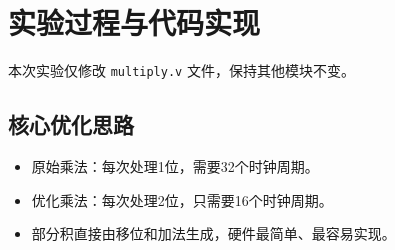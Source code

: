\documentclass[12pt,a4paper]{article}
\begin{document}
\section{实验过程与代码实现}
本次实验仅修改 \texttt{multiply.v} 文件，保持其他模块不变。

\subsection{核心优化思路}
\begin{itemize}
    \item 原始乘法：每次处理1位，需要32个时钟周期。
    \item 优化乘法：每次处理2位，只需要16个时钟周期。
    \item 部分积直接由移位和加法生成，硬件最简单、最容易实现。
\end{itemize}
\end{document}
